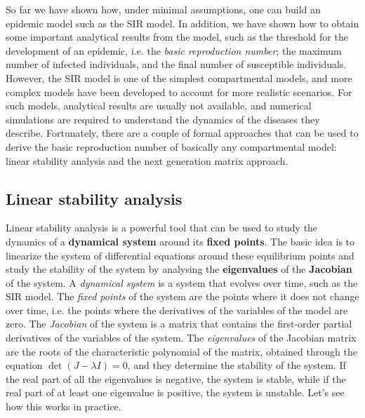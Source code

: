 So far we have shown how, under minimal assumptions, one can build an epidemic
model such as the SIR model. In addition, we have shown how to obtain some
important analytical results from the model, such as the threshold for the
development of an epidemic, i.e. the \textit{basic reproduction number}; the
maximum number of infected individuals, and the final number of susceptible
individuals. However, the SIR model is one of the simplest compartmental
models, and more complex models have been developed to account for more
realistic scenarios. For such models, analytical results are usually not
available, and numerical simulations are required to understand the dynamics of
the diseases they describe. Fortunately, there are a couple of formal
approaches that can be used to derive the basic reproduction number of
basically any compartmental model: linear stability analysis and the next
generation matrix approach.

\subsection{Linear stability analysis}

Linear stability analysis is a powerful tool that can be used to study the
dynamics of a \textbf{dynamical system} around its \textbf{fixed points}. The
basic idea is to linearize the system of differential equations around these
equilibrium points and study the stability of the system by analysing the
\textbf{eigenvalues} of the \textbf{Jacobian} of the system. A
\textit{dynamical system} is a system that evolves over time,
such as the SIR model. The \textit{fixed points} of the system are the points
where it does not change over time, i.e. the points where the derivatives of
the variables of the model are zero. The \textit{Jacobian} of the system is a
matrix that contains the first-order partial derivatives of the variables of
the system. The \textit{eigenvalues} of the Jacobian matrix are the roots of
the characteristic polynomial of the matrix, obtained through the equation
$\det(J-\lambda I)=0 $, and they determine the stability of the system. If the
real part of all the eigenvalues is negative, the system is stable, while if
the real part of at least one eigenvalue is positive, the system is unstable.
Let's see how this works in practice.


